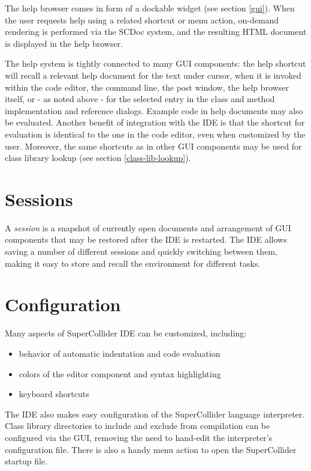 \documentclass[11pt,a4paper]{article}
\begin{document}
The help browser comes in form of a dockable widget (see section \ref{gui}). When the user requests help using a related
shortcut or menu action, on-demand rendering is performed via the SCDoc system, and the resulting HTML document is
displayed in the help browser.

The help system is tightly connected to many GUI components: the help shortcut will recall a relevant help document
for the text under cursor, when it is invoked within the code editor, the command line, the post window, the help
browser itself, or - as noted above - for the selected entry in the class and method implementation and reference
dialogs. Example code in help documents may also be evaluated. Another benefit of integration with the IDE is that the
shortcut for evaluation is identical to the one in the code editor, even when customized by the user. Moreover, the same
shortcuts as in other GUI components may be used for class library lookup (see section \ref{class-lib-lookup}).

\section{Sessions}

A \emph{session} is a snapshot of currently open documents and arrangement of GUI components that may be restored
after the IDE is restarted. The IDE allows saving a number of different sessions and quickly switching between them,
making it easy to store and recall the environment for different tasks.

\section{Configuration}

Many aspects of SuperCollider IDE can be customized, including:
\begin{itemize}
 \item behavior of automatic indentation and code evaluation
 \item colors of the editor component and syntax highlighting
 \item keyboard shortcuts
\end{itemize}

The IDE also makes easy configuration of the SuperCollider language interpreter. Class library directories to include
and exclude from compilation can be configured via the GUI, removing the need to hand-edit the interpreter's
configuration file. There is also a handy menu action to open the SuperCollider startup file.
\end{document}
